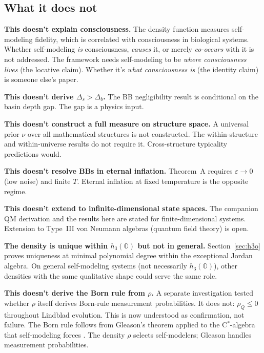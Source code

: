 \documentclass[12pt]{article}
\theoremstyle{remark}
\begin{document}
\subsection{What it does not}\label{sec:what-not}

\textbf{This doesn't explain consciousness.} The density function measures self-modeling fidelity, which is correlated with consciousness in biological systems. Whether self-modeling \emph{is} consciousness, \emph{causes} it, or merely \emph{co-occurs} with it is not addressed. The framework needs self-modeling to be \emph{where consciousness lives} (the locative claim). Whether it's \emph{what consciousness is} (the identity claim) is someone else's paper.

\textbf{This doesn't derive $\Delta_s > \Delta_b$.} The BB negligibility result is conditional on the basin depth gap. The gap is a physics input.

\textbf{This doesn't construct a full measure on structure space.} A universal prior $\nu$ over all mathematical structures is not constructed. The within-structure and within-universe results do not require it. Cross-structure typicality predictions would.

\textbf{This doesn't resolve BBs in eternal inflation.} Theorem~A requires $\varepsilon \to 0$ (low noise) and finite $T$. Eternal inflation at fixed temperature is the opposite regime.

\textbf{This doesn't extend to infinite-dimensional state spaces.} The companion QM derivation \cite{ehrlich2026qm} and the results here are stated for finite-dimensional systems. Extension to Type~III von Neumann algebras (quantum field theory) is open.

\textbf{The density is unique within $h_3(\mathbb{O})$ but not in general.} Section~\ref{sec:h3o} proves uniqueness at minimal polynomial degree within the exceptional Jordan algebra.  On general self-modeling systems (not necessarily $h_3(\mathbb{O})$), other densities with the same qualitative shape could serve the same role.

\textbf{This doesn't derive the Born rule from $\rho$.} A separate investigation \cite{ehrlich2026born} tested whether $\rho$ itself derives Born-rule measurement probabilities. It does not: $\rho_Q \leq 0$ throughout Lindblad evolution. This is now understood as confirmation, not failure. The Born rule follows from Gleason's theorem \cite{gleason1957} applied to the C$^*$-algebra that self-modeling forces \cite{ehrlich2026qm}. The density $\rho$ selects self-modelers; Gleason handles measurement probabilities.
\end{document}
